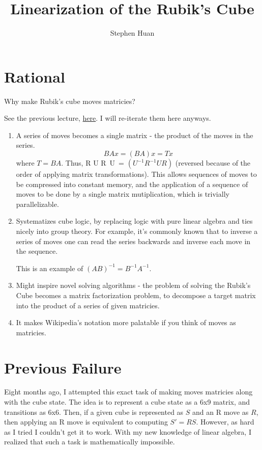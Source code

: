 \documentclass[11pt, oneside]{article}
\title{Linearization of the Rubik's Cube}
\author{Stephen Huan}
\newcommand{\dash}{\textquotesingle}
\begin{document}
\maketitle

\section{Rational}
Why make Rubik's cube moves matricies?

See the previous lecture, \href{https://activities.tjhsst.edu/cubing/static/pdfs/Matricization/matrix.pdf}{here}. I will re-iterate them here anyways.
\begin{enumerate}
  \item A series of moves becomes a single matrix - the product of the moves
  in the series.
  \[ BAx = (BA)x = Tx \] where \( T = BA \).
  Thus, R U R\dash \ U\dash \ = \( (U^{-1} R^{-1} U R) \)
  (reversed because of the order of applying matrix transformations).
  This allows sequences of moves to be compressed into constant memory,
  and the application of a sequence of moves to be done by a single matrix mutiplication,
  which is trivially parallelizable.

  \item Systematizes cube logic, by replacing logic with pure linear algebra
  and ties nicely into group theory.
  For example, it's commonly known that to inverse a series of moves
  one can read the series backwards and inverse each move in the sequence.

  This is an example of \( (AB)^{-1} = B^{-1}A^{-1} \).

  \item Might inspire novel solving algorithms - the problem of solving the Rubik's Cube
  becomes a matrix factorization problem, to decompose a target matrix into the
  product of a series of given matricies.

  \item It makes Wikipedia's notation more palatable if you think of moves as matricies.
\end{enumerate}

\section{Previous Failure}
Eight months ago, I attempted this exact task of making moves matricies along
with the cube state. The idea is to represent a cube state as a 6x9 matrix,
and transitions as 6x6. Then, if a given cube is represented as \( S \)
and an R move as \( R \), then applying an R move is equivalent to
computing \( S' = R S \). However, as hard as I tried I couldn't get it to work.
With my new knowledge of linear algebra, I realized that such a task is
mathematically impossible.
\end{document}
